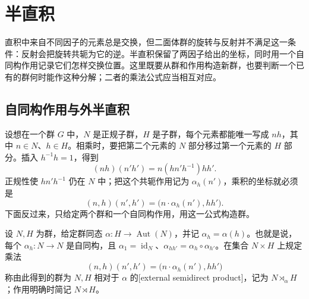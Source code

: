 
\section{半直积}
\label{b1:sec:0602}

直积中来自不同因子的元素总是交换，但二面体群的旋转与反射并不满足这一条件：反射会把旋转共轭为它的逆。半直积保留了两因子给出的坐标，同时用一个自同构作用记录它们怎样交换位置。这里既要从群和作用构造新群，也要判断一个已有的群何时能作这种分解；二者的乘法公式应当相互对应。


%
%

\subsection{自同构作用与外半直积}
\label{b1:subsec:0602:01}

设想在一个群 \(G\) 中，\(N\) 是正规子群，\(H\) 是子群，每个元素都能唯一写成 \(nh\)，其中 \(n\in N\)、\(h\in H\)。相乘时，要把第二个元素的 \(N\) 部分移过第一个元素的 \(H\) 部分。插入 \(h^{-1}h=1\)，得到
\[
	(nh)(n'h')=n(hn'h^{-1})hh'.
\]
正规性使 \(hn'h^{-1}\) 仍在 \(N\) 中；把这个共轭作用记为 \(\alpha_h(n')\)，乘积的坐标就必须是
\[
	(n,h)(n',h')=\bigl(n\cdot\alpha_h(n'),hh'\bigr).
\]
下面反过来，只给定两个群和一个自同构作用，用这一公式构造群。

\begin{definition}\label{b1:def:semidirect-product}
	设 \(N,H\) 为群，给定群同态 \(\alpha:H\rightarrow\operatorname{Aut}(N)\)，并记 \(\alpha_h=\alpha(h)\)。也就是说，每个 \(\alpha_h:N\rightarrow N\) 是自同构，且 \(\alpha_1=\operatorname{id}_N\)、\(\alpha_{hh'}=\alpha_h\circ\alpha_{h'}\)。在集合 \(N\times H\) 上规定乘法
	\[
		(n,h)(n',h')=\bigl(n\cdot\alpha_h(n'),hh'\bigr)
	\]
	称由此得到的群为 \(N,H\) 相对于 \(\alpha\) 的[external semidirect product]，记为 \(N\rtimes_\alpha H\)；作用明确时简记 \(N\rtimes H\)。
\end{definition}

